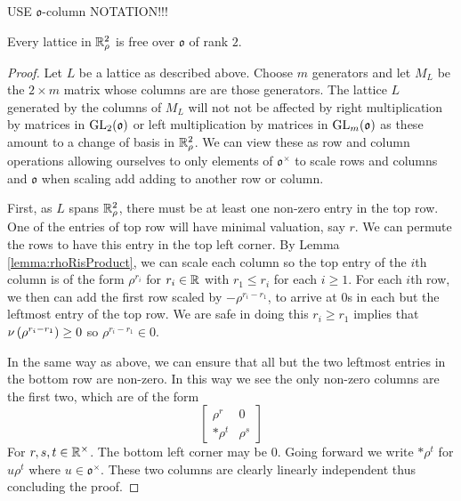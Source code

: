 \documentclass[draft]{amsart}
\begin{document}
    USE \(\mathfrak o\)-column NOTATION!!!
    \begin{prop}\label{prop:latticesAreFree} Every lattice in \(\mathbb{R}^2_\rho\) is free over \(\mathfrak o\) of rank \(2\). 
\end{prop}
    \begin{proof}
    Let \(L\) be a lattice as described above. Choose \(m\) generators and let \(M_L\) be the \(2\times m\) matrix whose columns are are those generators. The lattice \(L\) generated by the columns of \(M_L\) will not not be affected by right multiplication by matrices in \(\mathrm{GL}_2{(\mathfrak o)}\) or left multiplication by matrices in \(\mathrm{GL}_m{(\mathfrak o)}\) as these  amount to a change of basis in \(\mathbb{R}_\rho^2\). We can view these as row and column operations allowing ourselves to only elements of \(\mathfrak o^\times \) to scale rows and columns and \(\mathfrak o\) when scaling add adding to another row or column.
    
    First, as \(L\) spans \(\mathbb{R}^2_\rho\), there must be at least one non-zero entry in the top row. One of the entries of top row will have minimal valuation, say \(r\). We can permute the rows to have this entry in the top left corner. By Lemma \ref{lemma:rhoRisProduct}, we can scale each column so the top entry of the \(i\)th column is of the form \(\rho^{r_i}\) for \(r_i\in \mathbb{R}\) with \(r_1\le r_i\) for each \(i\ge 1\). For each \(i\)th row, we then can add the first row scaled by \(-\rho^{r_i-r_1}\), to arrive at \(0\)s in each but the leftmost entry of the top row. We are safe in doing this \(r_i\ge r_1\) implies that \(\nu\left( \rho^{r_i-r_1} \right)\ge 0\) so \(\rho^{r_i-r_1}\in \mathfrak 0\).

    In the same way as above, we can ensure that all but the two leftmost entries in the bottom row are non-zero. In this way we see the only non-zero columns are the first two, which are of the form
    \[\begin{bmatrix}
        \rho^r & 0\\ *\rho^t & \rho^s
    \end{bmatrix}\]
    For \(r,s,t\in \mathbb{R}^\times\). The bottom left corner may be 0. Going forward we write \(*\rho^t\) for \(u\rho^t\) where \(u\in \mathfrak o^\times\). These two columns are clearly linearly independent thus concluding the proof. 
    \end{proof}
\end{document}
